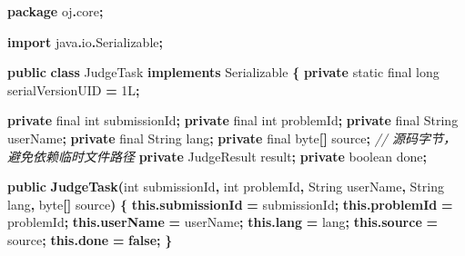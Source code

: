 \documentclass[
  11pt,
]{ctexart}
\newenvironment{Shaded}{\begin{snugshade}}{\end{snugshade}}
\newcommand{\BuiltInTok}[1]{#1}
\newcommand{\CommentTok}[1]{\textcolor[rgb]{0.56,0.35,0.01}{\textit{#1}}}
\newcommand{\DataTypeTok}[1]{\textcolor[rgb]{0.13,0.29,0.53}{#1}}
\newcommand{\DecValTok}[1]{\textcolor[rgb]{0.00,0.00,0.81}{#1}}
\newcommand{\FunctionTok}[1]{\textcolor[rgb]{0.13,0.29,0.53}{\textbf{#1}}}
\newcommand{\ImportTok}[1]{#1}
\newcommand{\KeywordTok}[1]{\textcolor[rgb]{0.13,0.29,0.53}{\textbf{#1}}}
\newcommand{\NormalTok}[1]{#1}
\newcommand{\OperatorTok}[1]{\textcolor[rgb]{0.81,0.36,0.00}{\textbf{#1}}}
\begin{document}
\begin{Shaded}
\begin{Highlighting}[]
\KeywordTok{package}\ImportTok{ oj}\OperatorTok{.}\ImportTok{core}\OperatorTok{;}

\KeywordTok{import} \ImportTok{java}\OperatorTok{.}\ImportTok{io}\OperatorTok{.}\ImportTok{Serializable}\OperatorTok{;}

\KeywordTok{public} \KeywordTok{class}\NormalTok{ JudgeTask }\KeywordTok{implements} \BuiltInTok{Serializable} \OperatorTok{\{}
    \KeywordTok{private} \DataTypeTok{static} \DataTypeTok{final} \DataTypeTok{long}\NormalTok{ serialVersionUID }\OperatorTok{=} \DecValTok{1L}\OperatorTok{;}

    \KeywordTok{private} \DataTypeTok{final} \DataTypeTok{int}\NormalTok{ submissionId}\OperatorTok{;}
    \KeywordTok{private} \DataTypeTok{final} \DataTypeTok{int}\NormalTok{ problemId}\OperatorTok{;}
    \KeywordTok{private} \DataTypeTok{final} \BuiltInTok{String}\NormalTok{ userName}\OperatorTok{;}
    \KeywordTok{private} \DataTypeTok{final} \BuiltInTok{String}\NormalTok{ lang}\OperatorTok{;}
    \KeywordTok{private} \DataTypeTok{final} \DataTypeTok{byte}\OperatorTok{[]}\NormalTok{ source}\OperatorTok{;}      \CommentTok{// 源码字节，避免依赖临时文件路径}
    \KeywordTok{private}\NormalTok{ JudgeResult result}\OperatorTok{;}
    \KeywordTok{private} \DataTypeTok{boolean}\NormalTok{ done}\OperatorTok{;}

    \KeywordTok{public} \FunctionTok{JudgeTask}\OperatorTok{(}\DataTypeTok{int}\NormalTok{ submissionId}\OperatorTok{,} \DataTypeTok{int}\NormalTok{ problemId}\OperatorTok{,}
                     \BuiltInTok{String}\NormalTok{ userName}\OperatorTok{,} \BuiltInTok{String}\NormalTok{ lang}\OperatorTok{,} \DataTypeTok{byte}\OperatorTok{[]}\NormalTok{ source}\OperatorTok{)} \OperatorTok{\{}
        \KeywordTok{this}\OperatorTok{.}\FunctionTok{submissionId} \OperatorTok{=}\NormalTok{ submissionId}\OperatorTok{;}
        \KeywordTok{this}\OperatorTok{.}\FunctionTok{problemId}    \OperatorTok{=}\NormalTok{ problemId}\OperatorTok{;}
        \KeywordTok{this}\OperatorTok{.}\FunctionTok{userName}     \OperatorTok{=}\NormalTok{ userName}\OperatorTok{;}
        \KeywordTok{this}\OperatorTok{.}\FunctionTok{lang}         \OperatorTok{=}\NormalTok{ lang}\OperatorTok{;}
        \KeywordTok{this}\OperatorTok{.}\FunctionTok{source}       \OperatorTok{=}\NormalTok{ source}\OperatorTok{;}
        \KeywordTok{this}\OperatorTok{.}\FunctionTok{done}         \OperatorTok{=} \KeywordTok{false}\OperatorTok{;}
    \OperatorTok{\}}


\end{Highlighting}
\end{Shaded}
\end{document}
